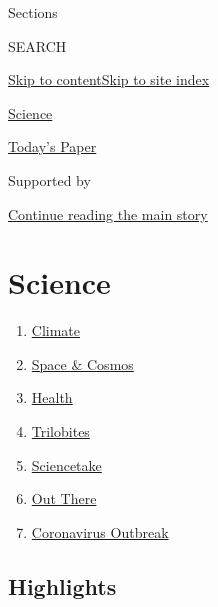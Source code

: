 Sections

SEARCH

\protect\hyperlink{site-content}{Skip to
content}\protect\hyperlink{site-index}{Skip to site index}

\href{https://www.nytimes3xbfgragh.onion/section/science}{Science}

\href{https://myaccount.nytimes3xbfgragh.onion/auth/login?response_type=cookie\&client_id=vi}{}

\href{https://www.nytimes3xbfgragh.onion/section/todayspaper}{Today's
Paper}

Supported by

\protect\hyperlink{after-sponsor}{Continue reading the main story}

\hypertarget{science}{%
\section{Science}\label{science}}

\begin{enumerate}
\def\labelenumi{\arabic{enumi}.}
\tightlist
\item
  \href{/section/climate}{Climate}
\item
  \href{/section/science/space}{Space \& Cosmos}
\item
  \href{/section/health}{Health}
\item
  \href{/column/trilobites}{Trilobites}
\item
  \href{/column/sciencetake}{Sciencetake}
\item
  \href{/column/out-there}{Out There}
\item
  \href{/news-event/coronavirus}{Coronavirus Outbreak}
\end{enumerate}

\hypertarget{highlights}{%
\subsection{Highlights}\label{highlights}}

